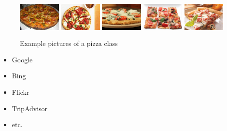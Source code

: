 \documentclass[10pt]{article}
\newif\ifen
\newif\ifde
\newcommand{\en}[1]{\ifen#1\fi}
\newcommand{\de}[1]{\ifde#1\fi}
\begin{document}
			\begin{figure}[H]
				\centering
				\includegraphics[width=0.19\textwidth]{images/data/pizza/pizza73.png}
				\includegraphics[width=0.19\textwidth]{images/data/pizza/pizza76.jpg}
				\includegraphics[width=0.19\textwidth]{images/data/pizza/pizza92.jpg}
				\includegraphics[width=0.19\textwidth]{images/data/pizza/pizza108.jpg}
				\includegraphics[width=0.19\textwidth]{images/data/pizza/pizza239.jpg}
				\caption[Example pictures of a pizza class]{Example pictures of a pizza class}
				\label{fig:class_pizza}
			\end{figure}

			\de{An Daten zu gelangen ist oftmals nicht so einfach. Jede Datenquelle hat ihre eigenen Besonderheiten. Eine Möglichkeit an Daten zu gelangen wäre ein automatische Crawling von Bilddatenbanken, Suchmaschinen oder Rezensionen, in welchen Bilder vorkommen. Ein gewisses Maß an Kreativität ist von Vorteil:}
			\en{Accessing data is often not that easy. Every data source has its own special features. One way to access data would be an automatic crawling of image databases, search engines or reviews in which images appear. A certain amount of creativity is advantageous:}

			\begin{itemize}
				\item Google
				\item Bing
				\item Flickr
				\item TripAdvisor
				\item etc.
			\end{itemize}
			
\end{document}
